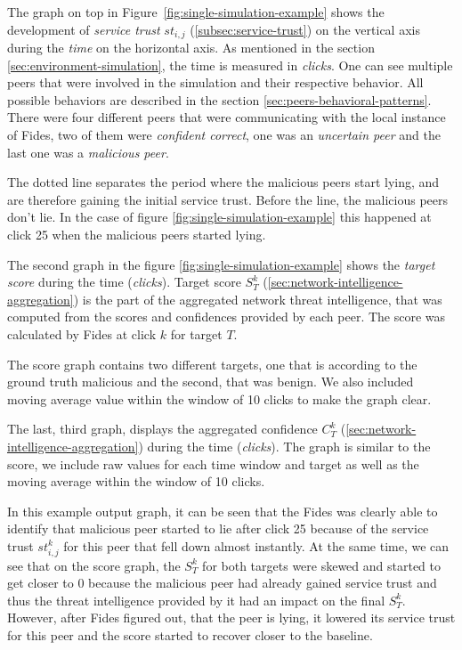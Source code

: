 The graph on top in Figure~\ref{fig:single-simulation-example} shows the development of \textit{service trust} $st_{i, j}$ (\ref{subsec:service-trust}) on the vertical axis during the \textit{time} on the horizontal axis. As mentioned in the section \ref{sec:environment-simulation}, the time is measured in \textit{clicks}.
One can see multiple peers that were involved in the simulation and their respective behavior. All possible behaviors are described in the section \ref{sec:peers-behavioral-patterns}.
There were four different peers that were communicating with the local instance of Fides, two of them were \textit{confident correct}, one was an \textit{uncertain peer} and the last one was a \textit{malicious peer}.

The dotted line separates the period where the malicious peers start lying, and are therefore gaining the initial service trust. Before the line, the malicious peers don't lie.
In the case of figure \ref{fig:single-simulation-example} this happened at click 25 when the malicious peers started lying.

The second graph in the figure \ref{fig:single-simulation-example} shows the \textit{target score} during the time (\textit{clicks}).
Target score $S^{k}_{T}$ (\ref{sec:network-intelligence-aggregation}) is the part of the aggregated network threat intelligence, that was computed from the scores and confidences provided by each peer.
The score was calculated by Fides at click $k$ for target $T$.

The score graph contains two different targets, one that is according to the ground truth malicious and the second, that was benign.
We also included moving average value within the window of 10 clicks to make the graph clear.

The last, third graph, displays the aggregated confidence $C^{k}_{T}$ (\ref{sec:network-intelligence-aggregation}) during the time (\textit{clicks}).
The graph is similar to the score, we include raw values for each time window and target as well as the moving average within the window of 10 clicks.

In this example output graph, it can be seen that the Fides was clearly able to identify that malicious peer started to lie after click 25 because of the service trust $st^{k}_{i,j}$ for this peer that fell down almost instantly.
At the same time, we can see that on the score graph, the $S^{k}_{T}$ for both targets were skewed and started to get closer to $0$ because the malicious peer had already gained service trust and thus the threat intelligence provided by it had an impact on the final $S^{k}_{T}$.
However, after Fides figured out, that the peer is lying, it lowered its service trust for this peer and the score started to recover closer to the baseline.